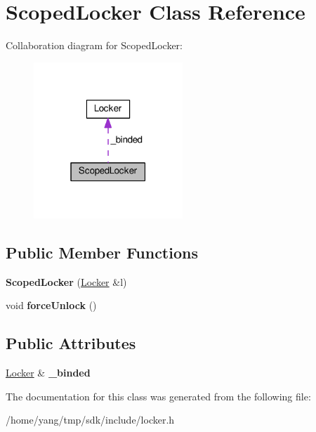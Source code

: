 \hypertarget{class_scoped_locker}{}\section{Scoped\+Locker Class Reference}
\label{class_scoped_locker}


Collaboration diagram for Scoped\+Locker\+:\nopagebreak
\begin{figure}[H]
\begin{center}
\leavevmode
\includegraphics[width=159pt]{class_scoped_locker__coll__graph}
\end{center}
\end{figure}
\subsection*{Public Member Functions}
\begin{DoxyCompactItemize}
\item 
{\bfseries Scoped\+Locker} (\hyperlink{class_locker}{Locker} \&l)\hypertarget{class_scoped_locker_a934b25a7af086a7230e96256ab2f54be}{}\label{class_scoped_locker_a934b25a7af086a7230e96256ab2f54be}

\item 
void {\bfseries force\+Unlock} ()\hypertarget{class_scoped_locker_a5a9c0873fb7c11ea588b627497208a41}{}\label{class_scoped_locker_a5a9c0873fb7c11ea588b627497208a41}

\end{DoxyCompactItemize}
\subsection*{Public Attributes}
\begin{DoxyCompactItemize}
\item 
\hyperlink{class_locker}{Locker} \& {\bfseries \+\_\+binded}\hypertarget{class_scoped_locker_abfc68c3a65391f09b81de01492bc60be}{}\label{class_scoped_locker_abfc68c3a65391f09b81de01492bc60be}

\end{DoxyCompactItemize}


The documentation for this class was generated from the following file\+:\begin{DoxyCompactItemize}
\item 
/home/yang/tmp/sdk/include/locker.\+h\end{DoxyCompactItemize}

